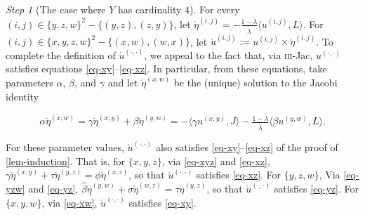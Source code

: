 \documentclass[ecta,nameyear,draft]{econsocart}
\makeatletter
\newcommand{\bs}{-}%
\newcommand\mpplus{\text{\srcsize$+\mkern-2mu+$}}
\newcommand{\mbbt}{{\mathds {T}}}
\renewcommand{\ij}{{(i, j)}}
\newcommand{\xy}{{(x, y)}}
\newcommand{\yz}{{(y,z)}}
\newcommand{\xz}{{(x,z)}}
\newcommand{\xw}{{(x,w)}}
\newcommand{\yw}{{(y,w)}}
\newcommand{\zw}{(z,w)}
\newcommand{\wz}{(w,z)}
\newcommand{\dd}{{(\cdot,\cdot)}}
\newcommand{\threejac}{\textup{\textsc{iii}-Jac}}
\newcommand{\srcsize}{\@setfontsize{\srcsize}{3pt}{3pt}}
\theoremstyle{plain}
\theoremstyle{remark}
\newtheorem{step}{Step}[section]
\makeatother
\begin{document}
\begin{appendix}
\begin{step}[The case where $Y$ has cardinality $4$]


    For every $(i, j) \in \{y,z,w\}^2 \bs \{(y, z), (z, y)\}$, let
    $\acute{\eta}^{\ij} = - \frac{1 - \acute{\lambda}}{\acute{\lambda}} \langle
    u^{\ij}, L \rangle$.  For $(i, j) \in \{x, y , z, w\}^2 \bs \{(x, w), (w,
    x)\}$, let $\acute{u}^{\ij}:= u^{\ij} \times \acute{\eta}^{\ij}$.  To
    complete the definition of $\acute{u}^{\dd}$, we appeal to the fact that, via
    \threejac, $u^{\dd}$ satisfies equations \eqref{eq-xy}--\eqref{eq-xz}. In
    particular, from these equations, take parameters $\alpha$, $\beta$, and
    $\gamma$ and let $\acute{\eta}^{\xw}$ be the (unique) solution to the Jacobi
    identity
    \begin{linenomath*}
      \begin{equation}\label{eq-xw}
        \alpha \acute{\eta}^{\xw} = \gamma \acute{\eta}^{\xy} + \beta
        \acute{\eta}^{\yw} = -\langle \gamma u^{\xy} , J \rangle -
        \tfrac{1-\acute{\lambda}}{\acute{\lambda}}\langle\beta u^{\yw}, L
        \rangle.
      \end{equation}
    \end{linenomath*}
    For these parameter values, $\acute{u}^{\dd}$ also satisfies
    \eqref{eq-xy}--\eqref{eq-xz} of the proof of \cref{lem-induction}. That is,
    for $\{x,y,z\}$, via \cref{eq-xyz} and \eqref{eq-xz}, $\gamma
    \acute{\eta}^{\xy}+\tau \acute{\eta}^{\yz} = \phi \acute{\eta}^{\xz}$, so
    that $\acute{u}^{\dd}$ satisfies \eqref{eq-xz}. For $\{y,z,w\}$, Via
    \cref{eq-yzw} and \eqref{eq-yz}, $\hat{\beta} \acute{\eta}^{\yw}+\sigma
    \acute{\eta}^{\wz} = \tau \acute{\eta}^{\yz}$, so that $\acute{u}^{\dd}$
    satisfies \eqref{eq-yz}. For $\{x,y,w\}$, via \cref{eq-xw}, $\acute{u}^{\dd}$
    satisfies \eqref{eq-xy}.


\end{step}
\end{appendix}
\end{document}
